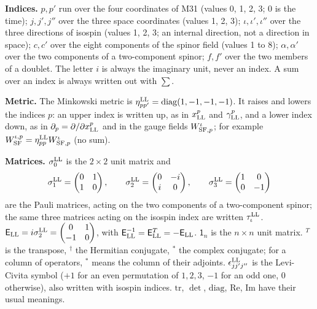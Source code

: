 \documentclass[
  10pt,
]{article}
\begin{document}
\textbf{Indices.} \(p,p'\) run over the four coordinates of M31 (values
0, 1, 2, 3; 0 is the time); \(j,j',j''\) over the three space
coordinates (values 1, 2, 3); \(\iota,\iota',\iota''\) over the three
directions of isospin (values 1, 2, 3; an internal direction, not a
direction in space); \(c,c'\) over the eight components of the spinor
field (values 1 to 8); \(\alpha,\alpha'\) over the two components of a
two-component spinor; \(f,f'\) over the two members of a doublet. The
letter \(i\) is always the imaginary unit, never an index. A sum over an
index is always written out with \(\sum\).

\textbf{Metric.} The Minkowski metric is
\(\eta^{\rm LL}_{pp'}=\mathrm{diag}(1,-1,-1,-1)\). It raises and lowers
the indices \(p\): an upper index is written up, as in \(x^p_{\rm LL}\)
and \(\gamma^p_{\rm LL}\), and a lower index down, as in
\(\partial_p=\partial/\partial x^p_{\rm LL}\) and in the gauge fields
\(W^\iota_{{\rm SF},p}\); for example
\(W^{\iota,p}_{\rm SF}=\eta^{\rm LL}_{pp}W^\iota_{{\rm SF},p}\) (no
sum).

\textbf{Matrices.} \(\sigma^{\rm LL}_0\) is the \(2\times2\) unit matrix
and
\[\sigma^{\rm LL}_1=\begin{pmatrix}0&1\\1&0\end{pmatrix},\qquad\sigma^{\rm LL}_2=\begin{pmatrix}0&-i\\i&0\end{pmatrix},\qquad\sigma^{\rm LL}_3=\begin{pmatrix}1&0\\0&-1\end{pmatrix}\]
are the Pauli matrices, acting on the two components of a two-component
spinor; the same three matrices acting on the isospin index are written
\(\tau^{\rm LL}_\iota\).
\(\mathsf E_{\rm LL}=i\sigma^{\rm LL}_2=\begin{pmatrix}0&1\\-1&0\end{pmatrix}\),
with
\(\mathsf E_{\rm LL}^{-1}=\mathsf E_{\rm LL}^T=-\mathsf E_{\rm LL}\).
\(\mathsf 1_n\) is the \(n\times n\) unit matrix. \({}^T\) is the
transpose, \({}^\dagger\) the Hermitian conjugate, \({}^*\) the complex
conjugate; for a column of operators, \({}^*\) means the column of their
adjoints. \(\epsilon^{\rm LL}_{jj'j''}\) is the Levi-Civita symbol
(\(+1\) for an even permutation of \(1,2,3\), \(-1\) for an odd one, 0
otherwise), also written with isospin indices. \(\mathrm{tr}\),
\(\det\), \(\mathrm{diag}\), \(\mathrm{Re}\), \(\mathrm{Im}\) have their
usual meanings.
\end{document}
